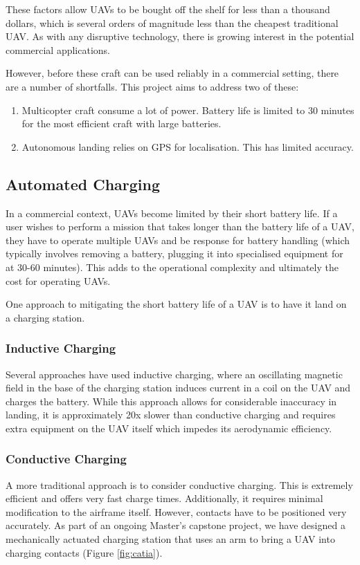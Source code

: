 \documentclass[10pt]{scrartcl} %
\begin{document}
These factors allow UAVs to be bought off the shelf for less than a thousand dollars, which is several orders of magnitude less than the cheapest traditional UAV. As with any disruptive technology, there is growing interest in the potential commercial applications. 

However, before these craft can be used reliably in a commercial setting, there are a number of shortfalls. This project aims to address two of these:
\begin{enumerate}
\item{Multicopter craft consume a lot of power. Battery life is limited to 30 minutes for the most efficient craft with large batteries.}
\item{Autonomous landing relies on GPS for localisation. This has limited accuracy.}
\end{enumerate}


\subsection{Automated Charging}

In a commercial context, UAVs become limited by their short battery life. If a user wishes to perform a mission that takes longer than the battery life of a UAV, they have to operate multiple UAVs and be response for battery handling (which typically involves removing a battery, plugging it into specialised equipment for at 30-60 minutes). This adds to the operational complexity and ultimately the cost for operating UAVs.

One approach to mitigating the short battery life of a UAV is to have it land on a charging station. 

\subsubsection{Inductive Charging}
Several approaches have used inductive charging, where an oscillating magnetic field in the base of the charging station induces current in a coil on the UAV and charges the battery. While this approach allows for considerable inaccuracy in landing, it is approximately 20x slower than conductive charging and requires extra equipment on the UAV itself which impedes its aerodynamic efficiency.

\subsubsection{Conductive Charging}
A more traditional approach is to consider conductive charging. This is extremely efficient and offers very fast charge times. Additionally, it requires minimal modification to the airframe itself. However, contacts have to be positioned very accurately. As part of an ongoing Master's capstone project, we have designed a mechanically actuated charging station that uses an arm to bring a UAV into charging contacts (Figure \ref{fig:catia}). 
\end{document}
